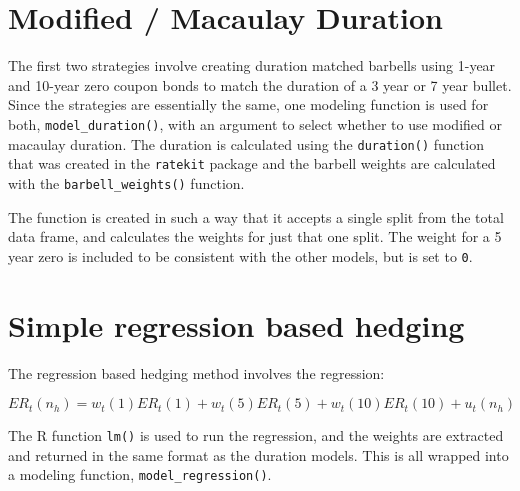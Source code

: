 \documentclass[openany]{book}
\theoremstyle{definition}
\theoremstyle{definition}
\theoremstyle{definition}
\theoremstyle{remark}
\begin{document}
\small

\normalsize

\small

\normalsize

\small

\normalsize

\small

\normalsize

\hypertarget{modified-macaulay-duration}{%
\section{Modified / Macaulay
Duration}\label{modified-macaulay-duration}}

The first two strategies involve creating duration matched barbells
using 1-year and 10-year zero coupon bonds to match the duration of a 3
year or 7 year bullet. Since the strategies are essentially the same,
one modeling function is used for both, \texttt{model\_duration()}, with
an argument to select whether to use modified or macaulay duration. The
duration is calculated using the \texttt{duration()} function that was
created in the \texttt{ratekit} package and the barbell weights are
calculated with the \texttt{barbell\_weights()} function.

The function is created in such a way that it accepts a single split
from the total data frame, and calculates the weights for just that one
split. The weight for a 5 year zero is included to be consistent with
the other models, but is set to \texttt{0}.

\small

\normalsize

\hypertarget{simple-regression-based-hedging}{%
\section{Simple regression based
hedging}\label{simple-regression-based-hedging}}

The regression based hedging method involves the regression:

\[ ER_t(n_h) = w_t(1) ER_t(1) + w_t(5) ER_t(5) + w_t(10) ER_t(10) + u_t(n_h) \]

The R function \texttt{lm()} is used to run the regression, and the
weights are extracted and returned in the same format as the duration
models. This is all wrapped into a modeling function,
\texttt{model\_regression()}.

\small

\normalsize
\end{document}
